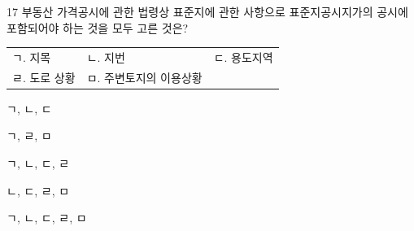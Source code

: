 \begin{question}{17}
부동산 가격공시에 관한 법령상 표준지에 관한 사항으로 표준지공시지가의 공시에 포함되어야 하는 것을 모두 고른 것은?
\begin{framedtext}
\begin{tabular}{@{}lll@{\hspace{3em}}}
ㄱ. 지목 & ㄴ. 지번 & ㄷ. 용도지역 \\
ㄹ. 도로 상황 & ㅁ. 주변토지의 이용상황 & \\
\end{tabular}
\end{framedtext}
\begin{choices}
  \item ㄱ, ㄴ, ㄷ
  \item ㄱ, ㄹ, ㅁ
  \item ㄱ, ㄴ, ㄷ, ㄹ
  \item ㄴ, ㄷ, ㄹ, ㅁ
  \item ㄱ, ㄴ, ㄷ, ㄹ, ㅁ
\end{choices}
\end{question}
